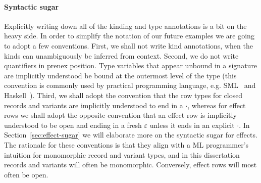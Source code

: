 \documentclass[12pt,phd,lfcs,twoside,openright,logo,leftchapter,normalheadings]{infthesis}
\theoremstyle{plain}
\theoremstyle{definition}
\begin{document}
\paragraph{Syntactic sugar}
Explicitly writing down all of the kinding and type annotations is a
bit on the heavy side. In order to simplify the notation of our future
examples we are going to adopt a few conventions. First, we shall not
write kind annotations, when the kinds can unambiguously be inferred
from context. Second, we do not write quantifiers in prenex
position. Type variables that appear unbound in a signature are
implicitly understood be bound at the outermost level of the type
(this convention is commonly used by practical programming language,
e.g. SML~\cite{MilnerTHM97} and
Haskell~\cite{JonesABBBFHHHHJJLMPRRW99}). Third, we shall adopt the
convention that the row types for closed records and variants are
implicitly understood to end in a $\cdot$, whereas for effect rows we
shall adopt the opposite convention that an effect row is implicitly
understood to be open and ending in a fresh $\varepsilon$ unless it
ends in an explicit $\cdot$. In Section~\ref{sec:effect-sugar} we will
elaborate more on the syntactic sugar for effects. The rationale for
these conventions is that they align with a ML programmer's intuition
for monomorphic record and variant types, and in this dissertation
records and variants will often be monomorphic. Conversely, effect
rows will most often be open.
\end{document}
